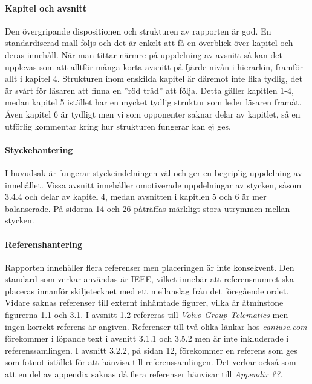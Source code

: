     \paragraph{Kapitel och avsnitt}
        Den övergripande dispositionen och strukturen av rapporten är god. En standardiserad mall följs och det är enkelt att få en överblick över kapitel och deras innehåll. När man tittar närmre på uppdelning av avsnitt så kan det upplevas som att alltför många korta avsnitt på fjärde nivån i hierarkin, framför allt i kapitel 4. Strukturen inom enskilda kapitel är däremot inte lika tydlig, det är svårt för läsaren att finna en ''röd tråd'' att följa. Detta gäller kapitlen 1-4, medan kapitel 5 istället har en mycket tydlig struktur som leder läsaren framåt. Även kapitel 6 är tydligt men vi som opponenter saknar delar av kapitlet, så en utförlig kommentar kring hur strukturen fungerar kan ej ges.
     
    \paragraph{Styckehantering}
        I huvudsak är fungerar styckeindelningen väl och ger en begriplig uppdelning av innehållet. Vissa avsnitt innehåller omotiverade uppdelningar av stycken, såsom 3.4.4 och delar av kapitel 4, medan avsnitten i kapitlen 5 och 6 är mer balanserade. På sidorna 14 och 26 påträffas märkligt stora utrymmen mellan stycken.

    \paragraph{Referenshantering}
        Rapporten innehåller flera referenser men placeringen är inte konsekvent. Den standard som verkar användas är IEEE, vilket innebär att referensnumret ska placeras innanför skiljetecknet med ett mellanslag från det föregående ordet. Vidare saknas referenser till externt inhämtade figurer, vilka är åtminstone figurerna 1.1 och 3.1. I avsnitt 1.2 refereras till \emph{Volvo Group Telematics} men ingen korrekt referens är angiven. Referenser till två olika länkar hos \emph{caniuse.com} förekommer i löpande text i avsnitt 3.1.1 och 3.5.2 men är inte inkluderade i referenssamlingen. I avsnitt 3.2.2, på sidan 12, förekommer en referens som ges som fotnot istället för att hänvisa till referenssamlingen. Det verkar också som att en del av appendix saknas då flera referenser hänvisar till \emph{Appendix ??}.
    
